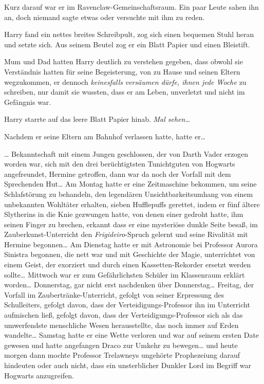 {Kurz darauf war er im Ravenclaw-Gemeinschaftsraum. Ein paar Leute sahen ihn an, doch niemand sagte etwas oder versuchte mit ihm zu reden.

Harry fand ein nettes breites Schreibpult, zog sich einen bequemen Stuhl heran und setzte sich. Aus seinem Beutel zog er ein Blatt Papier und einen Bleistift.

Mum und Dad hatten Harry deutlich zu verstehen gegeben, dass obwohl sie Verständnis hatten für seine Begeisterung, von zu Hause und seinen Eltern wegzukommen, er dennoch \emph{keinesfalls} \emph{versäumen dürfe, ihnen jede Woche} zu schreiben, nur damit sie wussten, dass er am Leben, unverletzt und nicht im Gefängnis war.

Harry starrte auf das leere Blatt Papier hinab. \emph{Mal sehen…}

Nachdem er seine Eltern am Bahnhof verlassen hatte, hatte er…

… Bekanntschaft mit einem Jungen geschlossen, der von Darth Vader erzogen worden war, sich mit den drei berüchtigtsten Tunichtguten von Hogwarts angefreundet, Hermine getroffen, dann war da noch der Vorfall mit dem Sprechenden Hut… Am Montag hatte er eine Zeitmaschine bekommen, um seine Schlafstörung zu behandeln, den legendären Unsichtbarkeitsumhang von einem unbekannten Wohltäter erhalten, sieben Hufflepuffs gerettet, indem er fünf ältere Slytherins in die Knie gezwungen hatte, von denen einer gedroht hatte, ihm seinen Finger zu brechen, erkannt dass er eine mysteriöse dunkle Seite besaß, im Zauberkunst-Unterricht den \emph{Frigideiro}-Spruch gelernt und seine Rivalität mit Hermine begonnen… Am Dienstag hatte er mit Astronomie bei Professor Aurora Sinistra begonnen, die nett war und mit Geschichte der Magie, unterrichtet von einem Geist, der exorziert und durch einen Kassetten-Rekorder ersetzt werden sollte… Mittwoch war er zum Gefährlichsten Schüler im Klassenraum erklärt worden… Donnerstag, gar nicht erst nachdenken über Donnerstag… Freitag, der Vorfall im Zaubertränke-Unterricht, gefolgt von seiner Erpressung des Schulleiters, gefolgt davon, dass der Verteidigungs-Professor ihn im Unterricht aufmischen ließ, gefolgt davon, dass der Verteidigungs-Professor sich als das umwerfendste menschliche Wesen herausstellte, das noch immer auf Erden wandelte… Samstag hatte er eine Wette verloren und war auf seinem ersten Date gewesen und hatte angefangen Draco zur Umkehr zu bewegen… und heute morgen dann mochte Professor Trelawneys ungehörte Prophezeiung darauf hindeuten oder auch nicht, dass ein unsterblicher Dunkler Lord im Begriff war Hogwarts anzugreifen.

}
